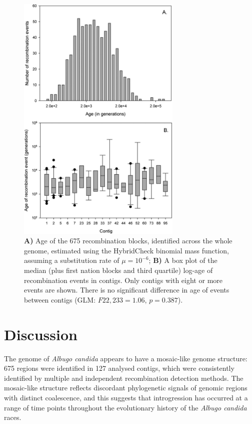 \begin{figure}
\centering
\includegraphics[width=0.7\textwidth]{Figures/AlbugoCandida/AC_Figure3}
\caption{\textbf{A)} Age of the 675 recombination blocks, identified across the whole genome, estimated using the HybridCheck binomial mass function, assuming a substitution rate of $\mu = 10^{−6}$; \textbf{B)} A box plot of the median (plus first nation blocks and third quartile) log-age of recombination events in contigs. Only contigs with eight or more events are shown. There is no significant difference in age of events between contigs (GLM: $F22, 233 = 1.06$, $p = 0.387$).\label{fig:AC_Res_3}}
\end{figure}


\section{Discussion}

The genome of \textit{Albugo candida} appears to have a mosaic-like genome structure: 675 regions were identified in 127 analysed contigs, which were consistently identified by multiple and independent recombination detection methods. 
The mosaic-like structure reflects discordant phylogenetic signals of genomic regions with distinct coalescence, and this suggests that introgression has occurred at a range of time points throughout the evolutionary history of the \textit{Albugo candida} races.

